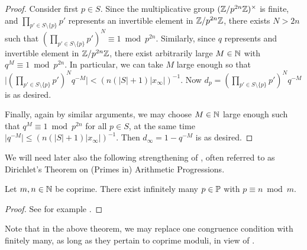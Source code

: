 \documentclass[12pt, leqno, british]{amsart}
\begin{document}
\begin{proof}
Consider first $p \in S$.
Since the multiplicative group $(\mathbb Z/p^{2n}\mathbb Z)^\times$ is finite, and $\prod_{p' \in S \setminus \lbrace p \rbrace} p'$ represents an invertible element in $\mathbb Z/p^{2n}\mathbb Z$, there exists $N > 2n$ such that $(\prod_{p' \in S \setminus \lbrace p \rbrace} p')^N \equiv 1 \bmod p^{2n}$.
Similarly, since $q$ represents and invertible element in $\mathbb Z/p^{2n}\mathbb Z$, there exist arbitrarily large $M \in \mathbb N$ with $q^M \equiv 1 \bmod p^{2n}$.
In particular, we can take $M$ large enough so that $\lvert (\prod_{p' \in S \setminus \lbrace p \rbrace} p')^N q^{-M} \rvert < (n(\lvert S \rvert + 1)\lvert x_\infty \rvert)^{-1}$.
Now $d_p = (\prod_{p' \in S \setminus \lbrace p \rbrace} p')^N q^{-M}$ is as desired.

Finally, again by similar arguments, we may choose $M \in \mathbb N$ large enough such that $q^{M} \equiv 1 \bmod p^{2n}$ for all $p \in S$, at the same time $\lvert q^{-M} \rvert \leq (n(\lvert S \rvert + 1) \lvert x_\infty \rvert)^{-1}$.
Then $d_\infty = 1 - q^{-M}$ is as desired.
\end{proof}
We will need later also the following strengthening of , often referred to as Dirichlet's Theorem on (Primes in) Arithmetic Progressions.
\begin{thm}\label{T:Dirichlet}
Let $m, n \in \mathbb N$ be coprime.
There exist infinitely many $p \in \mathbb P$ with $p \equiv n \bmod m$.
\end{thm}
\begin{proof}
See for example \cite[Section I.10, Exercise 1]{Neu99}.
\end{proof}
Note that in the above theorem, we may replace one congruence condition with finitely many, as long as they pertain to coprime moduli, in view of .
\end{document}
